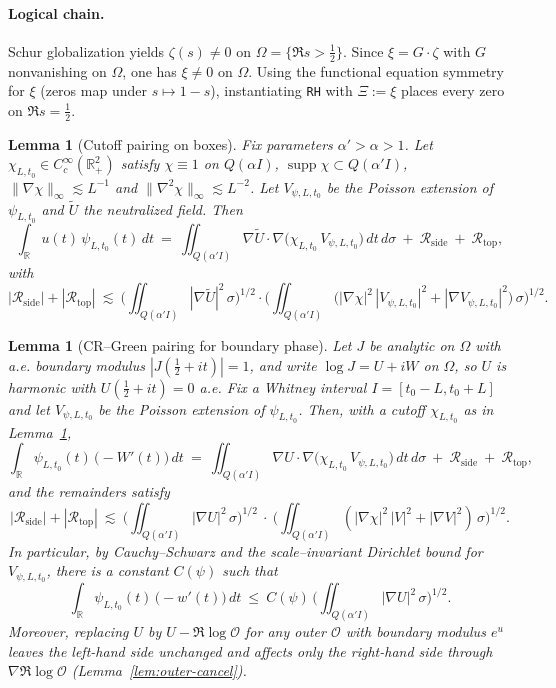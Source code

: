 \documentclass[11pt]{article}
\newtheorem{lemma}[theorem]{Lemma}
\theoremstyle{definition}
\theoremstyle{remark}
\newcommand{\R}{\mathbb{R}}
\begin{document}
\paragraph{Logical chain.}
Schur globalization yields $\zeta(s)\neq 0$ on $\Omega=\{\Re s>\tfrac12\}$. Since $\xi=G\cdot\zeta$ with $G$ nonvanishing on $\Omega$, one has $\xi\neq 0$ on $\Omega$. Using the functional equation symmetry for $\xi$ (zeros map under $s\mapsto 1-s$), instantiating \texttt{RH} with $\Xi:=\xi$ places every zero on $\Re s=\tfrac12$.
\begin{lemma}[Cutoff pairing on boxes]\label{lem:cutoff-pairing}
Fix parameters $\alpha'>\alpha>1$. Let $\chi_{L,t_0}\in C_c^\infty(\R^2_+)$ satisfy $\chi\equiv1$ on $Q(\alpha I)$, $\operatorname{supp}\chi\subset Q(\alpha'I)$, $\|\nabla\chi\|_\infty\lesssim L^{-1}$ and $\|\nabla^2\chi\|_\infty\lesssim L^{-2}$. Let $V_{\psi,L,t_0}$ be the Poisson extension of $\psi_{L,t_0}$ and $\widetilde U$ the neutralized field. Then
\[
 \int_{\R} u(t)\,\psi_{L,t_0}(t)\,dt
 \ =\ \iint_{Q(\alpha'I)} \nabla \widetilde U\cdot \nabla\big(\chi_{L,t_0}\, V_{\psi,L,t_0}\big)\,dt\,d\sigma\ +\ \mathcal R_{\mathrm{side}}\ +\ \mathcal R_{\mathrm{top}},
\]
with
\[
 |\mathcal R_{\mathrm{side}}|+|\mathcal R_{\mathrm{top}}|
 \ \lesssim\ \Big(\iint_{Q(\alpha'I)} |\nabla \widetilde U|^2\,\sigma\Big)^{1/2}
               \cdot \Big(\iint_{Q(\alpha'I)} \big(|\nabla\chi|^2\,|V_{\psi,L,t_0}|^2+|\nabla V_{\psi,L,t_0}|^2\big)\,\sigma\Big)^{1/2}.
\]
\end{lemma}
\begin{lemma}[CR–Green pairing for boundary phase]\label{lem:CR-green-phase}
Let $J$ be analytic on $\Omega$ with a.e. boundary modulus $|J(\tfrac12+it)|=1$, and write $\log J=U+iW$ on $\Omega$, so $U$ is harmonic with $U(\tfrac12+it)=0$ a.e. Fix a Whitney interval $I=[t_0-L,t_0+L]$ and let $V_{\psi,L,t_0}$ be the Poisson extension of $\psi_{L,t_0}$. Then, with a cutoff $\chi_{L,t_0}$ as in Lemma~\ref{lem:cutoff-pairing},
\[
  \int_{\R} \psi_{L,t_0}(t)\,\big(-W'(t)\big)\,dt\ =\ \iint_{Q(\alpha'I)} \nabla U\cdot \nabla\big(\chi_{L,t_0}\,V_{\psi,L,t_0}\big)\,dt\,d\sigma\ +\ \mathcal R_{\mathrm{side}}\ +\ \mathcal R_{\mathrm{top}},
\]
and the remainders satisfy
\[
  |\mathcal R_{\mathrm{side}}|+|\mathcal R_{\mathrm{top}}|\ \lesssim\ \Big(\iint_{Q(\alpha'I)} |\nabla U|^2\,\sigma\Big)^{1/2}\ \cdot\ \Big(\iint_{Q(\alpha'I)} (|\nabla\chi|^2\,|V|^2+|\nabla V|^2)\,\sigma\Big)^{1/2}.
\]
In particular, by Cauchy–Schwarz and the scale–invariant Dirichlet bound for $V_{\psi,L,t_0}$, there is a constant $C(\psi)$ such that
\[
  \int_{\R} \psi_{L,t_0}(t)\,\big(-w'(t)\big)\,dt\ \le\ C(\psi)\,\Big(\iint_{Q(\alpha'I)} |\nabla U|^2\,\sigma\Big)^{1/2}.
\]
Moreover, replacing $U$ by $U-\Re\log\mathcal O$ for any outer $\mathcal O$ with boundary modulus $e^{u}$ leaves the left-hand side unchanged and affects only the right-hand side through $\nabla\Re\log\mathcal O$ (Lemma~\ref{lem:outer-cancel}).
\end{lemma}
\end{document}
